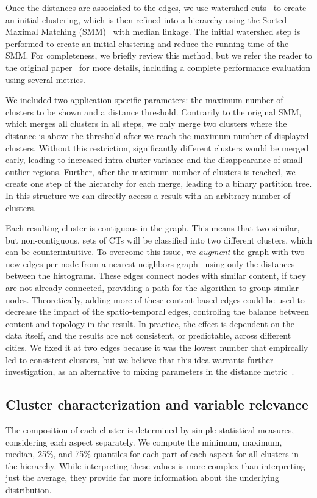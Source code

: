 Once the distances are associated to the edges, we use watershed
cuts~\cite{Cousty2009} to create an initial clustering, which is then refined
into a hierarchy using the Sorted Maximal Matching (SMM)~\cite{markus2017} with
median linkage. The initial watershed step is performed to create an initial
clustering and reduce the running time of the SMM. For completeness, we briefly
review this method, but we refer the reader to the original
paper~\cite{markus2017} for more details, including a complete performance
evaluation using several metrics.


We included two application-specific parameters: the maximum number of clusters
to be shown and a distance threshold. Contrarily to the original SMM, which
merges all clusters in all steps, we only merge two clusters where the distance
is above the threshold after we reach the maximum number of displayed clusters.
Without this restriction, significantly different clusters would be merged
early, leading to increased intra cluster variance and the disappearance of
small outlier regions. Further, after the maximum number of clusters is reached,
we create one step of the hierarchy for each merge, leading to a binary
partition tree. In this structure we can directly access a result with an
arbitrary number of clusters.


Each resulting cluster is contiguous in the graph. This means that two similar,
but non-contiguous, sets of CTs will be classified into two different clusters,
which can be counterintuitive. To overcome this issue, we \emph{augment} the
graph with two new edges per node from a nearest neighbors
graph~\cite{scikit-learn} using only the distances between the histograms. These
edges connect nodes with similar content, if they are not already connected,
providing a path for the algorithm to group similar nodes. Theoretically, adding
more of these content based edges could be used to decrease the impact of the
spatio-temporal edges, controling the balance between content and topology in
the result. In practice, the effect is dependent on the data itself, and the
results are not consistent, or predictable, across different cities. We fixed it
at two edges because it was the lowest number that empircally led to consistent
clusters, but we believe that this idea warrants further investigation, as an
alternative to mixing parameters in the distance metric~\cite{Chavent2017}.



\subsection{Cluster characterization and variable relevance}
\label{sec:relevance}
The composition of each cluster is determined by simple statistical measures,
considering each aspect separately. We compute the minimum, maximum, median,
25\%, and 75\% quantiles for each part of each aspect for all clusters in the
hierarchy. While interpreting these values is more complex than interpreting
just the average, they provide far more information about the underlying
distribution.


